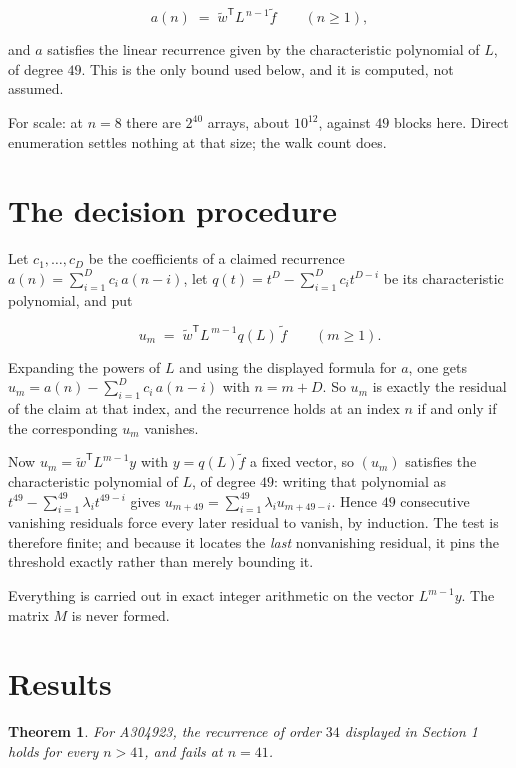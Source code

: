 \documentclass[11pt]{article}
\newtheorem{theorem}{Theorem}
\theoremstyle{definition}
\begin{document}
\[a(n) \;=\; \tilde w^{\mathsf T} L^{\,n-1} \tilde f \qquad (n \ge 1),\]

and $a$ satisfies the linear recurrence given by the characteristic polynomial of $L$, of degree $49$. This is the only bound used below, and it is computed, not assumed.

For scale: at $n = 8$ there are $2^{40}$ arrays, about $10^{12}$, against $49$ blocks here. Direct enumeration settles nothing at that size; the walk count does.

\section{The decision procedure}

Let $c_1,\dots,c_D$ be the coefficients of a claimed recurrence $a(n) = \sum_{i=1}^{D} c_i\,a(n-i)$, let $q(t) = t^{D} - \sum_{i=1}^{D} c_i t^{D-i}$ be its characteristic polynomial, and put

\[u_m \;=\; \tilde w^{\mathsf T} L^{\,m-1} q(L)\,\tilde f \qquad (m \ge 1).\]

Expanding the powers of $L$ and using the displayed formula for $a$, one gets $u_m = a(n) - \sum_{i=1}^{D} c_i\,a(n-i)$ with $n = m + D$. So $u_m$ is exactly the residual of the claim at that index, and the recurrence holds at an index $n$ if and only if the corresponding $u_m$ vanishes.

Now $u_m = \tilde w^{\mathsf T} L^{m-1} y$ with $y = q(L)\tilde f$ a fixed vector, so $(u_m)$ satisfies the characteristic polynomial of $L$, of degree $49$: writing that polynomial as $t^{49} - \sum_{i=1}^{49} \lambda_i t^{49-i}$ gives $u_{m+49} = \sum_{i=1}^{49} \lambda_i u_{m+49-i}$. Hence $49$ consecutive vanishing residuals force every later residual to vanish, by induction. The test is therefore finite; and because it locates the {\itshape last} nonvanishing residual, it pins the threshold exactly rather than merely bounding it.

Everything is carried out in exact integer arithmetic on the vector $L^{m-1}y$. The matrix $M$ is never formed.

\section{Results}

\begin{theorem} For A304923, the recurrence of order $34$ displayed in Section 1 holds for every $n > 41$, and fails at $n = 41$.\end{theorem}
\end{document}
